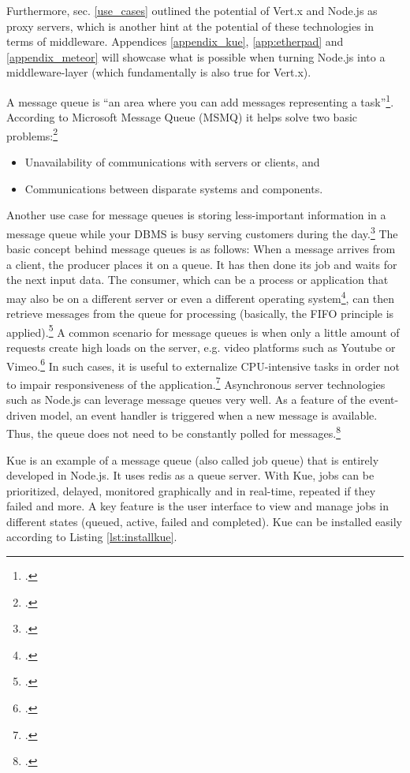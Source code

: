 \begin{appendices}
\begin{subappendices}
Furthermore, sec. \ref{use_cases}  outlined the potential of Vert.x and Node.js as proxy servers, which is another hint at the potential of these technologies in terms of middleware. Appendices \ref{appendix_kue}, \ref{app:etherpad} and \ref{appendix_meteor} will showcase what is possible when turning Node.js into a middleware-layer (which fundamentally is also true for Vert.x). 
\newpage

\label{appendix_kue}

A message queue is “an area where you can add messages representing a task”\footcite[][]{McGlennon_2007}. According to Microsoft Message Queue (MSMQ) it helps solve two basic problems:\footcite[Cf.][]{McGlennon_2007}
\begin{itemize}
  \item Unavailability of communications with servers or clients, and 
  \item Communications between disparate systems and components.
\end{itemize}
Another use case for message queues is storing less-important information in a message queue while your DBMS is busy serving customers during the day.\footcite[Cf.][449]{Thomson_2002}
The basic concept behind message queues is as follows: When a message arrives from a client, the producer places it on a queue. It has then done its job and waits for the next input data. The consumer, which can be a process or application that may also be on a different server or even a different operating system\footcite[Cf.][]{McGlennon_2007}, can then retrieve messages from the queue for processing (basically, the FIFO principle is applied).\footcite[Cf.][450]{Thomson_2002}
A common scenario for message queues is when only a little amount of requests create high loads on the server, e.g. video platforms such as Youtube or Vimeo.\footcite[Cf.][247]{Roden_2012} In such cases, it is useful to externalize CPU-intensive tasks in order not to impair responsiveness of the application.\footcite[Cf.][247]{Roden_2012}
Asynchronous server technologies such as Node.js can leverage message queues very well. As a feature of the event-driven model, an event handler is triggered when a new message is available. Thus, the queue does not need to be constantly polled for messages.\footcite[Cf.][]{Knight_2011}

Kue is an example of a message queue (also called job queue) that is entirely developed in Node.js. It uses redis as a queue server. With Kue, jobs can be prioritized, delayed, monitored graphically and in real-time, repeated if they failed and more. A key feature is the user interface to view and manage jobs in different states (queued, active, failed and completed). Kue can be installed easily according to Listing \ref{lst:installkue}.


\end{subappendices}
\end{appendices}
